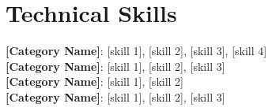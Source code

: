 \documentclass[letterpaper,11pt]{article}
\begin{document}
\section{Technical Skills}
 \begin{itemize}[leftmargin=0.15in, label={}]
    \small{\item{
     \textbf{[Category Name]}{: [skill 1], [skill 2], [skill 3], [skill 4]} \\
     \textbf{[Category Name]}{: [skill 1], [skill 2], [skill 3]} \\
     \textbf{[Category Name]}{: [skill 1], [skill 2]} \\
     \textbf{[Category Name]}{: [skill 1], [skill 2], [skill 3]}
    }}
 \end{itemize}


\end{document}
